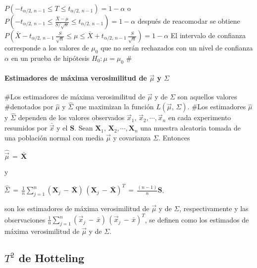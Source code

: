 \documentclass[english]{report}
\begin{document}
$P(-t_{\alpha/2,\,n-1} \leq T \leq t_{\alpha/2,\,n-1})=1-\alpha$
\vspace{5pt}
o
\vspace{5pt}
$P(-t_{\alpha/2,\,n-1} \leq \frac{\bar{X}-\mu}{S/\sqrt{n}} \leq t_{\alpha/2,\,n-1})=1-\alpha$
\vspace{5pt}
después de reacomodar se obtiene
\vspace{5pt}
$P(\bar{X}-t_{\alpha/2,\,n-1}\,\frac{S}{\sqrt{n}} \leq \mu \leq \bar{X}+t_{\alpha/2,\,n-1}\,\frac{S}{\sqrt{n}})= 1-\alpha$
\vspace{5pt}
El intervalo de confianza corresponde a los valores de $\mu_0$ que no serán rechazados con un nivel de confianza $\alpha$ en un prueba de hipótesis $H_0:\mu=\mu_0$
\vspace{5pt}
#\paragraph{Estimadores de máxima verosimilitud de $\vec{\mu}$ y $\Sigma$}
#Los estimadores de máxima verosimilitud de $\vec{\mu}$ y de $\Sigma$ son aquellos valores #denotados por $\hat{\mu}$ y $\hat{\Sigma}$ que maximizan la función $L(\vec{\mu},\,\Sigma)$.
#Los estimadores $\hat{\mu}$ y $\hat{\Sigma}$ dependen de los valores observados $\vec{x}_1,\,\vec{x}_2,\cdots,\vec{x}_n$ en cada experimento resumidos por $\bar{\vec{x}}$ y el $\textbf{S}$.
Sean $\textbf{X}_1,\,\textbf{X}_2,\cdots,\textbf{X}_n$ una muestra aleatoria tomada de una población normal con media $\vec{\mu}$ y covarianza $\Sigma$. Entonces
\vspace{10pt}

$\hat{\vec{\mu}}\,=\,\bar{\textbf{X}}\qquad$ 

\vspace{5pt}

y

\vspace{5pt}

$\hat{\Sigma}\,=\,\frac{1}{n}\sum_{j=1}^n (\textbf{X}_j\,-\,\bar{\textbf{X}})\,(\textbf{X}_j\,-\,\bar{\textbf{X}})^T\,=\,\frac{(n-1)}{n}\textbf{S}$.
\vspace{10pt}

son los estimadores de máxima verosimilitud de $\vec{\mu}$ y de $\Sigma$, respectivamente y las observaciones $\frac{1}{n}\sum_{j=1}^n (\vec{x}_j\,-\,\bar{x})\,(\vec{x}_j\,-\,\bar{x})^T$, se definen como los estimados de máxima verosimilitud de $\vec{\mu}$ y de $\Sigma$.

\subsection{$T^2$ de Hotteling}
\end{document}
